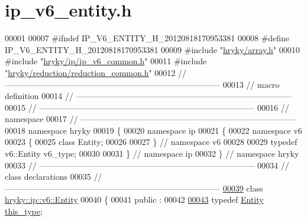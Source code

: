 \hypertarget{ip__v6__entity_8h_source}{\section{ip\-\_\-v6\-\_\-entity.\-h}
}

\begin{DoxyCode}
00001 
00007 \textcolor{preprocessor}{#ifndef IP\_V6\_ENTITY\_H\_20120818170953381}
00008 \textcolor{preprocessor}{}\textcolor{preprocessor}{#define IP\_V6\_ENTITY\_H\_20120818170953381}
00009 \textcolor{preprocessor}{}\textcolor{preprocessor}{#include "\hyperlink{array_8h}{hryky/array.h}"}
00010 \textcolor{preprocessor}{#include "\hyperlink{ip__v6__common_8h}{hryky/ip/ip_v6_common.h}"}
00011 \textcolor{preprocessor}{#include "\hyperlink{reduction__common_8h}{hryky/reduction/reduction_common.h}"}
00012 \textcolor{comment}{//
      ------------------------------------------------------------------------------}
00013 \textcolor{comment}{// macro definition}
00014 \textcolor{comment}{//
      ------------------------------------------------------------------------------}
00015 \textcolor{comment}{//
      ------------------------------------------------------------------------------}
00016 \textcolor{comment}{// namespace}
00017 \textcolor{comment}{//
      ------------------------------------------------------------------------------}
00018 \textcolor{keyword}{namespace }hryky
00019 \{
00020 \textcolor{keyword}{namespace }ip
00021 \{
00022 \textcolor{keyword}{namespace }v6
00023 \{
00025     \textcolor{keyword}{class }Entity;
00026 
00027 \} \textcolor{comment}{// namespace v6}
00028 
00029 \textcolor{keyword}{typedef} v6::Entity v6\_type;
00030 
00031 \} \textcolor{comment}{// namespace ip}
00032 \} \textcolor{comment}{// namespace hryky}
00033 \textcolor{comment}{//
      ------------------------------------------------------------------------------}
00034 \textcolor{comment}{// class declarations}
00035 \textcolor{comment}{//
      ------------------------------------------------------------------------------}
\hypertarget{ip__v6__entity_8h_source_l00039}{}\hyperlink{classhryky_1_1ip_1_1v6_1_1_entity}{00039} \textcolor{comment}{}\textcolor{keyword}{class }\hyperlink{classhryky_1_1ip_1_1v6_1_1_entity}{hryky::ip::v6::Entity}
00040 \{
00041 \textcolor{keyword}{public} :
00042 
\hypertarget{ip__v6__entity_8h_source_l00043}{}\hyperlink{classhryky_1_1ip_1_1v6_1_1_entity_a2d767b52e28cf8fea606e918d13bfbd7}{00043}     \textcolor{keyword}{typedef} \hyperlink{classhryky_1_1ip_1_1v6_1_1_entity}{Entity} \hyperlink{classhryky_1_1ip_1_1v6_1_1_entity_a2d767b52e28cf8fea606e918d13bfbd7}{this_type};

\end{DoxyCode}

